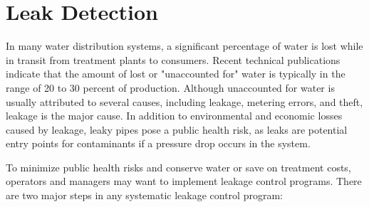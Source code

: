 \documentclass[10pt]{article}
\begin{document}
\section{Leak Detection}
In many water distribution systems, a significant percentage of water is lost while in transit from treatment plants to consumers. Recent technical publications indicate that the amount of lost or "unaccounted for" water is typically in the range of 20 to 30 percent of production. Although unaccounted for water is usually attributed to several causes, including leakage, metering errors, and theft, leakage is the major cause. In addition to environmental and economic losses caused by leakage, leaky pipes pose a public health risk, as leaks are potential entry points for contaminants if a pressure drop occurs in the system.

To minimize public health risks and conserve water or save on treatment costs, operators and managers may want to implement leakage control programs. There are two major steps in any systematic leakage control program:
\end{document}
